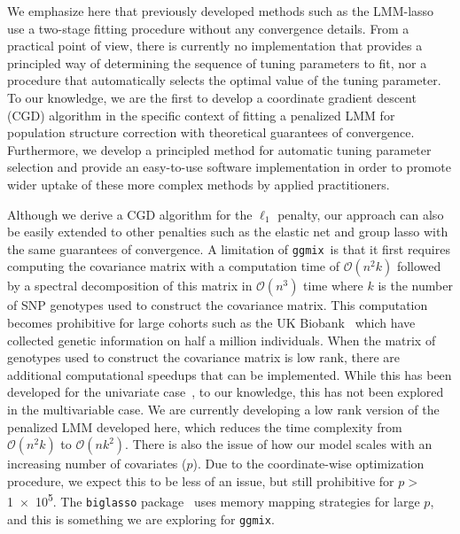 \documentclass[10pt,letterpaper]{article}
\newcommand{\ggmix}{\texttt{ggmix}}
\begin{document}
		
		
		
		We emphasize here that previously developed methods such as the LMM-lasso~\cite{rakitsch2013lasso} use a two-stage fitting procedure without any convergence details.
		From a practical point of view, there is currently no implementation that provides a principled way of determining the sequence of tuning parameters to fit, nor a procedure that automatically selects the optimal value of the tuning parameter.
		To our knowledge, we are the first to develop a coordinate gradient descent (CGD) algorithm in the specific context of fitting a penalized LMM for population structure correction with theoretical guarantees of convergence. Furthermore, we develop a principled method for automatic tuning parameter selection and provide an easy-to-use software implementation in order to promote wider uptake of these more complex methods by applied practitioners. 
		
		
		
		
		Although we derive a CGD algorithm for the $\ell_1$ penalty, our approach can also be easily extended to other penalties such as the elastic net and group lasso with the same guarantees of convergence. A limitation of \ggmix ~is that it first requires computing the covariance matrix with a computation time of $\mathcal{O}(n^2k)$ followed by a spectral decomposition of this matrix in $\mathcal{O}(n^3)$ time where $k$ is the number of SNP genotypes used to construct the covariance matrix. This computation becomes prohibitive for large cohorts such as the UK Biobank~\cite{allen2012uk} which have collected genetic information on half a million individuals. When the matrix of genotypes used to construct the covariance matrix is low rank, there are additional computational speedups that can be implemented. While this has been developed for the univariate case~\cite{lippert2011fast}, to our knowledge, this has not been explored in the multivariable case. We are currently developing a low rank version of the penalized LMM developed here, which reduces the time complexity from $\mathcal{O}(n^2k)$ to $\mathcal{O}(nk^2)$. There is also the issue of how our model scales with an increasing number of covariates ($p$). Due to the coordinate-wise optimization procedure, we expect this to be less of an issue, but still prohibitive for $p>$ \num{1e5}. The \texttt{biglasso} package~\cite{zeng2017biglasso} uses memory mapping strategies for large $p$, and this is something we are exploring for \texttt{ggmix}.
		
\end{document}

